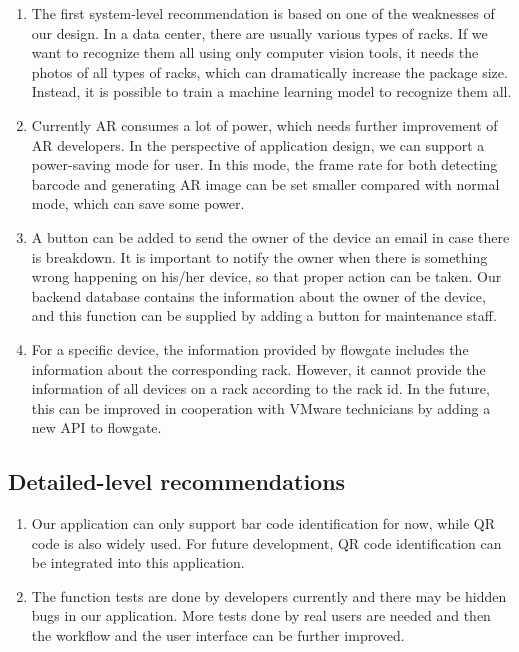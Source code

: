 \documentclass[11pt,a4paper]{article}
\begin{document}
\begin{onehalfspace}
\begin{enumerate}
    \item The first system-level recommendation is based on one of the weaknesses of our design. In a data center, there are usually various types of racks. If we want to recognize them all using only computer vision tools, it needs the photos of all types of racks, which can dramatically increase the package size. Instead, it is possible to train a machine learning model to recognize them all. 
    \item Currently AR consumes a lot of power, which needs further improvement of AR developers. In the perspective of application design, we can support a power-saving mode for user. In this mode, the frame rate for both detecting barcode and generating AR image can be set smaller compared with normal mode, which can save some power. 
    \item A button can be added to send the owner of the device an email in case there is breakdown. It is important to notify the owner when there is something wrong happening on his/her device, so that proper action can be taken. Our backend database contains the information about the owner of the device, and this function can be supplied by adding a button for maintenance staff.
    \item For a specific device, the information provided by flowgate includes the information about the corresponding rack. However, it cannot provide the information of all devices on a rack according to the rack id. In the future, this can be improved in cooperation with VMware technicians by adding a new API to flowgate.
\end{enumerate}

\subsection{Detailed-level recommendations}

\begin{enumerate}
    \item Our application can only support bar code identification for now, while QR code is also widely used. For future development, QR code identification can be integrated into this application.
    \item The function tests are done by developers currently and there may be hidden bugs in our application. More tests done by real users are needed and then the workflow and the user interface can be further improved. 
\end{enumerate}



\end{onehalfspace}
\end{document}
